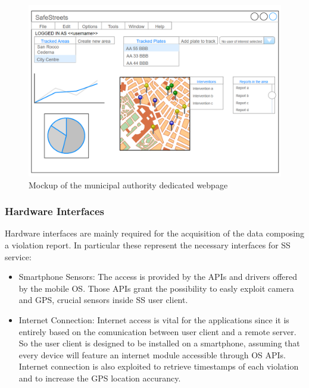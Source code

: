     \begin{figure}[h!]
    	\centering
    	\includegraphics[width=\textwidth]{Images/MunicipalAuthority_client_Mockup}
    	\caption{Mockup of the municipal authority dedicated webpage}
    \end{figure}
    
    \newpage
    
	\subsubsection{Hardware Interfaces}
	Hardware interfaces are mainly required for the acquisition of the data composing a violation report.
	In particular these represent the necessary interfaces for SS service:
		\begin{itemize}
			\item Smartphone Sensors:\newline
						The access is provided by the APIs and drivers offered by the mobile OS. Those APIs grant the possibility to easly exploit camera and GPS, crucial sensors inside SS user client.
			\item Internet Connection:\newline
						Internet access is vital for the applications since it is entirely based on the comunication between user client and a remote server. So the user client is designed to be installed on a smartphone, assuming that every device will feature an internet module accessible through OS APIs.\newline
						Internet connection is also exploited to retrieve timestamps of each violation and to increase the GPS location accurancy.
	\end{itemize}

